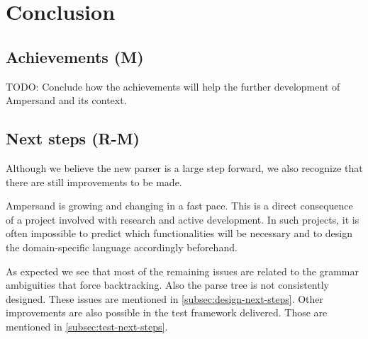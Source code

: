 
\section{Conclusion}
\label{sec:conclusion}

\subsection{Achievements (M)}
TODO: Conclude how the achievements will help the further development of Ampersand and its context.

\subsection{Next steps (R-M)}
Although we believe the new parser is a large step forward, we also recognize that there are still improvements to be made.

Ampersand is growing and changing in a fast pace.
This is a direct consequence of a project involved with research and active development.
In such projects, it is often impossible to predict which functionalities will be necessary and to design the domain-specific language accordingly beforehand.

As expected we see that most of the remaining issues are related to the grammar ambiguities that force backtracking.
Also the parse tree is not consistently designed.
These issues are mentioned in \autoref{subsec:design-next-steps}.
Other improvements are also possible in the test framework delivered.
Those are mentioned in \autoref{subsec:test-next-steps}.
